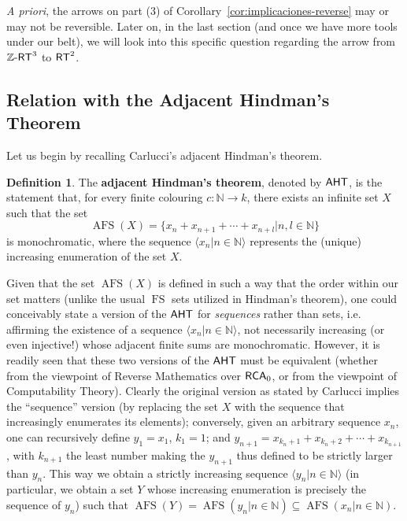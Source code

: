\documentclass[11pt]{amsart}
\newcommand{\rt}{\mathnormal{\mathsf{RT}}}
\newcommand{\zrt}{\mathnormal{\mathbb Z\text{-}\mathsf{RT}}}
\newcommand{\aht}{\mathnormal{\mathsf{AHT}}}
\newcommand{\rca}{\mathnormal{\mathsf{RCA}}_0}
\DeclareMathOperator{\afs}{AFS}
\DeclareMathOperator{\fs}{FS}
\theoremstyle{definition}
\newtheorem{definition}[theorem]{Definition}
\begin{document}
{\it A priori}, the arrows on part (3) of Corollary~\ref{cor:implicaciones-reverse} may or may not be reversible. Later on, in the last section (and once we have more tools under our belt), we will look into this specific question regarding the arrow from $\zrt^3$ to $\rt^2$.

\subsection{Relation with the Adjacent Hindman's Theorem}

Let us begin by recalling Carlucci's adjacent Hindman's theorem.

\begin{definition}
The {\bf adjacent Hindman's theorem}, denoted by $\aht$, is the statement that, for every finite colouring $c:\mathbb N\longrightarrow k$, there exists an infinite set $X$ such that the set
\begin{equation*}
\afs(X)=\{x_n+x_{n+1}+\cdots+x_{n+l}\big|n,l\in\mathbb N\}
\end{equation*}
is monochromatic, where the sequence $\langle x_n\big|n\in\mathbb N\rangle$ represents the (unique) increasing enumeration of the set $X$.
\end{definition}

Given that the set $\afs(X)$ is defined in such a way that the order within our set matters (unlike the usual $\fs$ sets utilized in Hindman's theorem), one could conceivably state a version of the $\aht$ for {\it sequences} rather than sets, i.e. affirming the existence of a sequence $\langle x_n\big|n\in\mathbb N\rangle$, not necessarily increasing (or even injective!) whose adjacent finite sums are monochromatic. However, it is readily seen that these two versions of the $\aht$ must be equivalent (whether from the viewpoint of Reverse Mathematics over $\rca$, or from the viewpoint of Computability Theory). Clearly the original version as stated by Carlucci implies the ``sequence'' version (by replacing the set $X$ with the sequence that increasingly enumerates its elements); conversely, given an arbitrary sequence $x_n$, one can recursively define $y_1=x_1$, $k_1=1$; and $y_{n+1}=x_{k_n+1}+x_{k_n+2}+\cdots+x_{k_{n+1}}$, with $k_{n+1}$ the least number making the $y_{n+1}$ thus defined to be strictly larger than $y_n$. This way we obtain a strictly increasing sequence $\langle y_n\big|n\in\mathbb N\rangle$ (in particular, we obtain a set $Y$ whose increasing enumeration is precisely the sequence of $y_n$) such that $\afs(Y)=\afs(y_n\big|n\in\mathbb N)\subseteq\afs(x_n\big|n\in\mathbb N)$.
\end{document}

